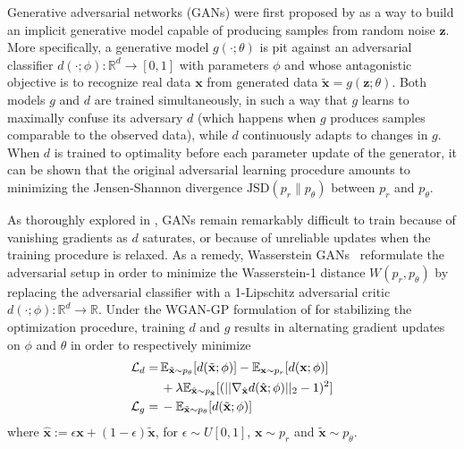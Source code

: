 \documentclass[twocolumn,superscriptaddress,aps]{revtex4-1}
\theoremstyle{plain}
\begin{document}
Generative adversarial networks (GANs) were first proposed by
\cite{goodfellow2014generative} as a way to build an implicit generative model
capable of producing samples from random noise $\mathbf{z}$. More specifically,
a generative model $g(\cdot; \theta)$ is pit against an adversarial
classifier $d(\cdot; \phi):\mathbb{R}^d \to [0,1]$ with parameters $\phi$ and whose antagonistic objective is to recognize real data $\mathbf{x}$
from generated data $\tilde{\mathbf{x}} = g(\mathbf{z}; \theta)$. Both models $g$ and $d$
are trained simultaneously, in such a way that $g$ learns to maximally confuse
its adversary $d$ (which happens when $g$ produces samples comparable to the
observed data), while $d$ continuously adapts to changes in $g$. When $d$ is
trained to optimality before each parameter update of the generator, it can
be shown that the original adversarial learning procedure amounts to minimizing
the Jensen-Shannon divergence $\text{JSD}(p_r \parallel p_\theta)$ between $p_r$ and $p_\theta$.

As thoroughly explored in \citep{2017arXiv170104862A}, GANs remain remarkably
difficult to train because of vanishing gradients as $d$ saturates, or because of
unreliable updates when the training procedure is relaxed. As a remedy,
Wasserstein GANs~\citep{2017arXiv170107875A} reformulate the adversarial
setup in order to minimize the Wasserstein-1 distance $W(p_r, p_\theta)$ by
replacing the adversarial classifier with a 1-Lipschitz adversarial critic
$d(\cdot; \phi) : \mathbb{R}^d \to \mathbb{R}$. Under the WGAN-GP formulation of \cite{2017arXiv170400028G}
for stabilizing the optimization procedure,
training $d$ and $g$ results in alternating gradient updates on $\phi$ and $\theta$ in order to respectively minimize
\begin{align}
    {\cal L}_d =\,& \mathbb{E}_{\tilde{\mathbf{x}} \sim p_\theta} [d(\tilde{\mathbf{x}};\phi)] - \mathbb{E}_{\mathbf{x} \sim p_r} [d(\mathbf{x};\phi)]  \nonumber \\
                  & + \lambda \mathbb{E}_{\hat{\mathbf{x}} \sim p_{\hat{\mathbf{x}}}} [(|| \nabla_{\hat{\mathbf{x}}} d({\hat{\mathbf{x}}};\phi) ||_2 - 1)^2] \\
    {\cal L}_g =\,& -\mathbb{E}_{\tilde{\mathbf{x}} \sim p_\theta} [d(\tilde{\mathbf{x}};\phi)]
\end{align}
where ${\hat{\mathbf{x}}} := \epsilon \mathbf{x} + (1-\epsilon)\tilde{\mathbf{x}}$, for $\epsilon \sim U[0,1]$, $\mathbf{x} \sim p_r$ and $\tilde{\mathbf{x}} \sim p_\theta$.
\end{document}
